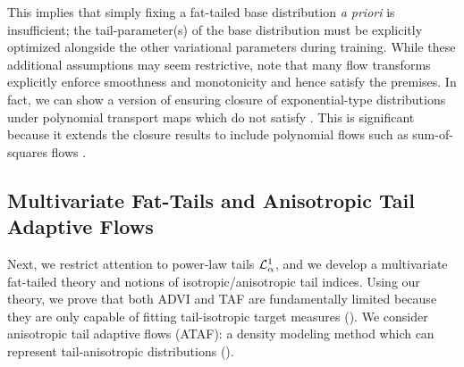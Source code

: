 \documentclass[thesis.tex]{subfiles}
\begin{document}

This implies that simply fixing a fat-tailed base
distribution \emph{a priori} is insufficient; the tail-parameter(s) of the base distribution must be explicitly optimized alongside
the other variational parameters during training.
While these additional assumptions may seem restrictive, note that many flow transforms
explicitly enforce smoothness and monotonicity \citep{wehenkel2019unconstrained,huang2018neural,durkan2019neural}
and hence satisfy the premises. In fact, we can show a version of  ensuring closure of exponential-type
distributions under polynomial transport maps which do not satisfy .
This is significant because it extends the closure results to
include polynomial flows such as sum-of-squares flows \citep{jaini2019sum}.




\vspace{-2mm}
\subsection{Multivariate Fat-Tails and Anisotropic Tail Adaptive Flows}

\vspace{-1mm}
Next, we restrict attention to power-law tails $\mathcal{L}^1_\alpha$, and we develop a multivariate fat-tailed theory and notions of isotropic/anisotropic tail indices. Using our theory, we prove that both ADVI and TAF are fundamentally limited because they
are only capable of fitting tail-isotropic target measures ().
We consider anisotropic tail adaptive flows (ATAF): a density
modeling method which can represent tail-anisotropic distributions ().
\end{document}
